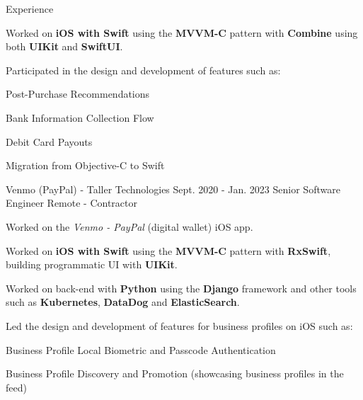 \documentclass{curriculum}
\begin{document}
\begin{cvsection}{Experience}
\begin{sectionitemlist}
        \item{
            Worked on \textbf{iOS with Swift} using the \textbf{MVVM-C} pattern
            with \textbf{Combine} using both \textbf{UIKit} and \textbf{SwiftUI}.
        }

        \item{
            Participated in the design and development of features such as:
        } {
            \begin{colsectionitemlist}{2}
            \item{Post-Purchase Recommendations}
            \item{Bank Information Collection Flow}
            \item{Debit Card Payouts}
            \item{Migration from Objective-C to Swift}
            \end{colsectionitemlist}
        }

        \end{sectionitemlist}


    \makesectionitemheader
        {Venmo (PayPal) - Taller Technologies}      {Sept. 2020 - Jan. 2023}
        {Senior Software Engineer}                  {Remote - Contractor}

        \begin{sectionitemlist}

        \item{
            Worked on the \textit{Venmo - PayPal} (digital wallet) iOS app.
        }

        \item{
            Worked on \textbf{iOS with Swift} using the \textbf{MVVM-C} pattern with \textbf{RxSwift},
            building programmatic UI with \textbf{UIKit}.
        }

        \item{
            Worked on back-end with \textbf{Python} using the \textbf{Django} framework
            and other tools such as \textbf{Kubernetes}, \textbf{DataDog} and \textbf{ElasticSearch}.
        }

        \item{
            Led the design and development of features for business profiles on iOS such as:
        }{
            \begin{colsectionitemlist}{2}
            \item{Business Profile Local Biometric and Passcode Authentication}
            \item{Business Profile Discovery and Promotion (showcasing business profiles in the feed)}
            \end{colsectionitemlist}
        }


\end{sectionitemlist}
\end{cvsection}
\end{document}
